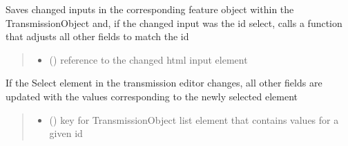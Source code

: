 \documentclass[letterpaper,10pt,english]{sphinxmanual}
\begin{document}
\begin{fulllineitems}
\label{\detokenize{docs_gui/js_api/urbs_editor/transmission_editor:writeBackTransmissionFeatures}}
\pysigstartsignatures
{}
\pysigstopsignatures
\sphinxAtStartPar
Saves changed inputs in the corresponding feature object within the TransmissionObject and, if the changed input was
the id select, calls a function that adjusts all other fields to match the id
\begin{quote}\begin{description}
\begin{itemize}
\item {} 
\sphinxAtStartPar
{} () \textendash{} reference to the changed html input element

\end{itemize}

\end{description}\end{quote}

\end{fulllineitems}


\begin{fulllineitems}
\label{\detokenize{docs_gui/js_api/urbs_editor/transmission_editor:fillInputFieldsOfSelectedID}}
\pysigstartsignatures
{}
\pysigstopsignatures
\sphinxAtStartPar
If the Select element in the transmission editor changes, all other fields are updated with the values corresponding to the newly selected element
\begin{quote}\begin{description}
\begin{itemize}
\item {} 
\sphinxAtStartPar
{} () \textendash{} key for TransmissionObject list element that contains values for a given id

\end{itemize}

\end{description}\end{quote}

\end{fulllineitems}
\end{document}
